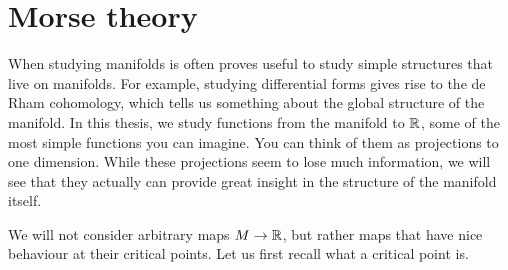 \chapter{Morse theory}

When studying manifolds is often proves useful to study simple structures that live on manifolds. For example, studying differential forms gives rise to the de Rham cohomology, which tells us something about the global structure of the manifold. In this thesis, we study functions from the manifold to $\mathbb{R}$, some of the most simple functions you can imagine. You can think of them as projections  to one dimension.
While these projections seem to lose much information, we will see that they actually can provide great insight in the structure of the manifold itself.

We will not consider arbitrary maps $M \to \mathbb{R}$, but rather maps that have nice behaviour at their critical points. Let us first recall what a critical point is.

